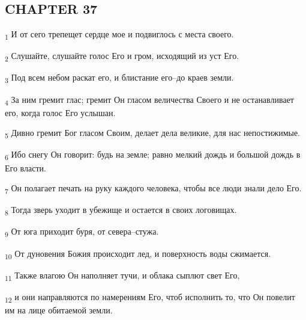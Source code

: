 \subsection{CHAPTER 37}
\begin{tcolorbox}
\textsubscript{1} И от сего трепещет сердце мое и подвиглось с места своего.
\end{tcolorbox}
\begin{tcolorbox}
\textsubscript{2} Слушайте, слушайте голос Его и гром, исходящий из уст Его.
\end{tcolorbox}
\begin{tcolorbox}
\textsubscript{3} Под всем небом раскат его, и блистание его--до краев земли.
\end{tcolorbox}
\begin{tcolorbox}
\textsubscript{4} За ним гремит глас; гремит Он гласом величества Своего и не останавливает его, когда голос Его услышан.
\end{tcolorbox}
\begin{tcolorbox}
\textsubscript{5} Дивно гремит Бог гласом Своим, делает дела великие, для нас непостижимые.
\end{tcolorbox}
\begin{tcolorbox}
\textsubscript{6} Ибо снегу Он говорит: будь на земле; равно мелкий дождь и большой дождь в Его власти.
\end{tcolorbox}
\begin{tcolorbox}
\textsubscript{7} Он полагает печать на руку каждого человека, чтобы все люди знали дело Его.
\end{tcolorbox}
\begin{tcolorbox}
\textsubscript{8} Тогда зверь уходит в убежище и остается в своих логовищах.
\end{tcolorbox}
\begin{tcolorbox}
\textsubscript{9} От юга приходит буря, от севера--стужа.
\end{tcolorbox}
\begin{tcolorbox}
\textsubscript{10} От дуновения Божия происходит лед, и поверхность воды сжимается.
\end{tcolorbox}
\begin{tcolorbox}
\textsubscript{11} Также влагою Он наполняет тучи, и облака сыплют свет Его,
\end{tcolorbox}
\begin{tcolorbox}
\textsubscript{12} и они направляются по намерениям Его, чтоб исполнить то, что Он повелит им на лице обитаемой земли.
\end{tcolorbox}
